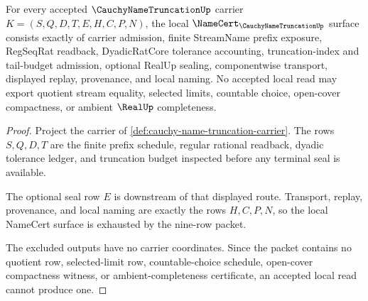 \begin{theorem}
\label{thm:cauchy-name-truncation-namecert-obligations}
For every accepted $\CauchyNameTruncationUp$ carrier $K=(S,Q,D,T,E,H,C,P,N)$, the local $\NameCert_{\CauchyNameTruncationUp}$ surface consists exactly of carrier admission, finite StreamName prefix exposure, RegSeqRat readback, DyadicRatCore tolerance accounting, truncation-index and tail-budget admission, optional RealUp sealing, componentwise transport, displayed replay, provenance, and local naming. No accepted local read may export quotient stream equality, selected limits, countable choice, open-cover compactness, or ambient $\RealUp$ completeness.
\end{theorem}
\begin{proof}
Project the carrier of \autoref{def:cauchy-name-truncation-carrier}. The rows $S,Q,D,T$ are the finite prefix schedule, regular rational readback, dyadic tolerance ledger, and truncation budget inspected before any terminal seal is available.

The optional seal row $E$ is downstream of that displayed route. Transport, replay, provenance, and local naming are exactly the rows $H,C,P,N$, so the local NameCert surface is exhausted by the nine-row packet.

The excluded outputs have no carrier coordinates. Since the packet contains no quotient row, selected-limit row, countable-choice schedule, open-cover compactness witness, or ambient-completeness certificate, an accepted local read cannot produce one.
\end{proof}

